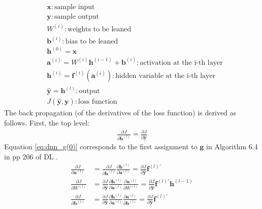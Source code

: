 \documentclass[a4]{article}
\begin{document}
\begin{equation}
\begin{aligned}
&\bm{x} : \text{sample input}\\
&\bm{y} : \text{sample output}\\
&W^{(i)} : \text{weights to be leaned}\\
&\bm{b}^{(i)} : \text{bias to be leaned}\\
&\bm{h}^{(0)} = \bm{x}\\
&\bm{a}^{(i)} = W^{(i)}\bm{h}^{(i-1)}+ \bm{b}^{(i)} : \text{activation at the i-th layer}\\
&\bm{h}^{(i)} = \bm{f}^{(i)}(\bm{a}^{(i)}) : \text{hidden variable at the i-th layer}\\
&\hat{\bm{y}} = \bm{h}^{(l)} : \text{output}\\
&J(\hat{\bm{y}}, \bm{y}) : \text{loss function}
\end{aligned}
\end{equation}
The back propagation (of the derivatives of the loss function) is derived as follows.
First, the top level:
\begin{equation}
\begin{aligned}
\frac{ \partial J }{ \partial \bm{h}^{(l)} } = \frac{ \partial J }{ \partial \hat{\bm{y}} }
\label{eq:dnn_g(0)}
\end{aligned}
\end{equation}
Equation \ref{eq:dnn_g(0)} corresponds to the first assignment to $\bm{g}$ in Algorithm 6.4 in pp 206 of
DL \cite{GoodBengCour16}.
\begin{equation}
\begin{aligned}
\frac{ \partial J }{ \partial \bm{a}^{(l)} } &= 
\frac{ \partial J }{ \partial \bm{h}^{(l)} }
\frac{ \partial \bm{h}^{(l)} }{ \partial \bm{a}^{(l)} } = 
\frac{ \partial J }{ \partial \hat{\bm{y}} }
\bm{f}^{(l)'}\\
\frac{ \partial J } { \partial W^{(l)} } &= 
\frac{ \partial J }{ \partial \hat{\bm{y}} }
\frac{ \partial \bm{h}^{(l)} }{ \partial \bm{a}^{(l)} }
\frac{ \partial \bm{a}^{(l)} }{ \partial W^{(l)} } = 
\frac{ \partial J }{ \partial \hat{\bm{y}} }
\bm{f}^{(l)'}
\bm{h}^{(l-1)}\\
\frac{ \partial J } { \partial \bm{b}^{(l)} } &= 
\frac{ \partial J }{ \partial \hat{\bm{y}} }
\frac{ \partial \bm{h}^{(l)} }{ \partial \bm{a}^{(l)} }
\frac{ \partial \bm{a}^{(l)} }{ \partial \bm{b}^{(l)} } = 
\frac{ \partial J }{ \partial \hat{\bm{y}} }
\bm{f}^{(l)'}
\end{aligned}
\end{equation}
\end{document}
